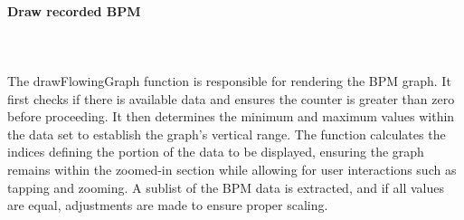 {{	\paragraph{Draw recorded BPM}\mbox{}\\
	\mbox{}\\
	The drawFlowingGraph function is responsible for rendering the BPM graph. It first checks if there is available data and ensures the counter is greater than zero before proceeding. It then determines the minimum and maximum values within the data set to establish the graph's vertical range. The function calculates the indices defining the portion of the data to be displayed, ensuring the graph remains within the zoomed-in section while allowing for user interactions such as tapping and zooming. A sublist of the BPM data is extracted, and if all values are equal, adjustments are made to ensure proper scaling.
	
}}
